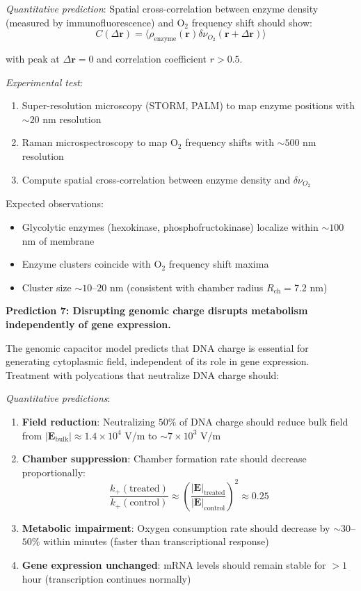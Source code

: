 \documentclass[twocolumn,10pt,aps,prd,superscriptaddress,floatfix,nofootinbib]{revtex4-2}
\theoremstyle{remark}
\begin{document}
\textit{Quantitative prediction}: Spatial cross-correlation between enzyme density (measured by immunofluorescence) and O$_2$ frequency shift should show:
\begin{equation}
C(\Delta\mathbf{r}) = \langle\rho_{\mathrm{enzyme}}(\mathbf{r})\delta\nu_{O_2}(\mathbf{r}+\Delta\mathbf{r})\rangle
\end{equation}

with peak at $\Delta\mathbf{r} = 0$ and correlation coefficient $r > 0.5$.

\textit{Experimental test}:
\begin{enumerate}
\item Super-resolution microscopy (STORM, PALM) to map enzyme positions with $\sim 20$ nm resolution
\item Raman microspectroscopy to map O$_2$ frequency shifts with $\sim 500$ nm resolution
\item Compute spatial cross-correlation between enzyme density and $\delta\nu_{O_2}$
\end{enumerate}

Expected observations:
\begin{itemize}
\item Glycolytic enzymes (hexokinase, phosphofructokinase) localize within $\sim 100$ nm of membrane
\item Enzyme clusters coincide with O$_2$ frequency shift maxima
\item Cluster size $\sim 10$--$20$ nm (consistent with chamber radius $R_{\mathrm{ch}} = 7.2$ nm)
\end{itemize}

\textbf{Prediction 7: Disrupting genomic charge disrupts metabolism independently of gene expression.}

The genomic capacitor model predicts that DNA charge is essential for generating cytoplasmic field, independent of its role in gene expression. Treatment with polycations that neutralize DNA charge should:

\textit{Quantitative predictions}:
\begin{enumerate}
\item \textbf{Field reduction}: Neutralizing $50\%$ of DNA charge should reduce bulk field from $|\mathbf{E}_{\mathrm{bulk}}| \approx 1.4 \times 10^4$ V/m to $\sim 7 \times 10^3$ V/m

\item \textbf{Chamber suppression}: Chamber formation rate should decrease proportionally:
\begin{equation}
\frac{k_+(\text{treated})}{k_+(\text{control})} \approx \left(\frac{|\mathbf{E}|_{\mathrm{treated}}}{|\mathbf{E}|_{\mathrm{control}}}\right)^2 \approx 0.25
\end{equation}

\item \textbf{Metabolic impairment}: Oxygen consumption rate should decrease by $\sim 30$--$50\%$ within minutes (faster than transcriptional response)

\item \textbf{Gene expression unchanged}: mRNA levels should remain stable for $>1$ hour (transcription continues normally)
\end{enumerate}
\end{document}
